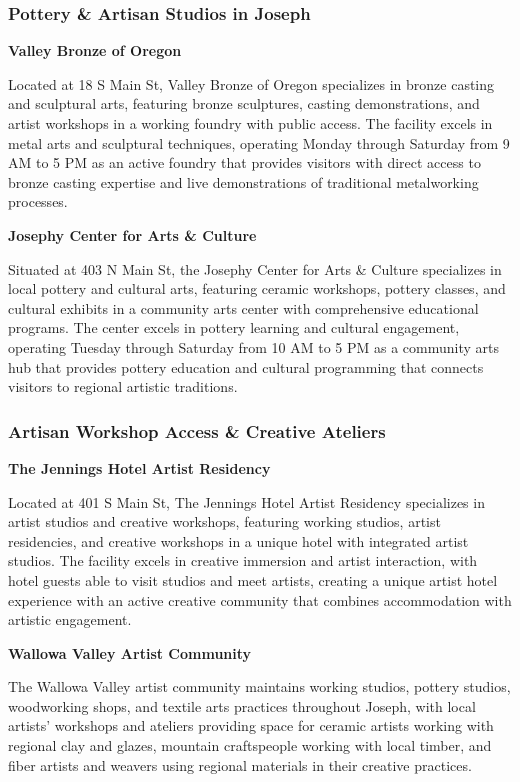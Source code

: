 \documentclass[
  11pt,
  letterpaper,
  DIV=10,
  numbers=noendperiod]{scrartcl}
\begin{document}
\subsubsection{Pottery \& Artisan Studios in
Joseph}\label{pottery-artisan-studios-in-joseph}

\textbf{Valley Bronze of Oregon}

Located at 18 S Main St, Valley Bronze of Oregon specializes in bronze
casting and sculptural arts, featuring bronze sculptures, casting
demonstrations, and artist workshops in a working foundry with public
access. The facility excels in metal arts and sculptural techniques,
operating Monday through Saturday from 9 AM to 5 PM as an active foundry
that provides visitors with direct access to bronze casting expertise
and live demonstrations of traditional metalworking processes.

\textbf{Josephy Center for Arts \& Culture}

Situated at 403 N Main St, the Josephy Center for Arts \& Culture
specializes in local pottery and cultural arts, featuring ceramic
workshops, pottery classes, and cultural exhibits in a community arts
center with comprehensive educational programs. The center excels in
pottery learning and cultural engagement, operating Tuesday through
Saturday from 10 AM to 5 PM as a community arts hub that provides
pottery education and cultural programming that connects visitors to
regional artistic traditions.

\subsubsection{Artisan Workshop Access \& Creative
Ateliers}\label{artisan-workshop-access-creative-ateliers-1}

\textbf{The Jennings Hotel Artist Residency}

Located at 401 S Main St, The Jennings Hotel Artist Residency
specializes in artist studios and creative workshops, featuring working
studios, artist residencies, and creative workshops in a unique hotel
with integrated artist studios. The facility excels in creative
immersion and artist interaction, with hotel guests able to visit
studios and meet artists, creating a unique artist hotel experience with
an active creative community that combines accommodation with artistic
engagement.

\textbf{Wallowa Valley Artist Community}

The Wallowa Valley artist community maintains working studios, pottery
studios, woodworking shops, and textile arts practices throughout
Joseph, with local artists' workshops and ateliers providing space for
ceramic artists working with regional clay and glazes, mountain
craftspeople working with local timber, and fiber artists and weavers
using regional materials in their creative practices.
\end{document}
